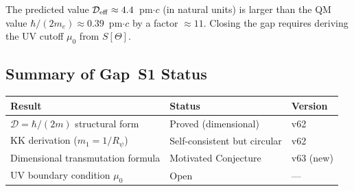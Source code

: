 \documentclass[12pt]{article}
\theoremstyle{definition}
\theoremstyle{remark}
\begin{document}
The predicted value $\mathcal{D}_{\rm eff} \approx 4.4$~pm$\cdot c$ (in natural
units) is larger than the QM value $\hbar/(2m_e) \approx 0.39$~pm$\cdot c$ by
a factor $\approx 11$.  Closing the gap requires deriving the UV cutoff
$\mu_0$ from $S[\Theta]$.

\subsection{Summary of Gap~S1 Status}

\begin{center}
\renewcommand{\arraystretch}{1.3}
\begin{tabular}{lll}
\hline
\textbf{Result} & \textbf{Status} & \textbf{Version} \\
\hline
$\mathcal{D} = \hbar/(2m)$ structural form & Proved (dimensional) & v62 \\
KK derivation ($m_1 = 1/R_\psi$) & Self-consistent but circular & v62 \\
Dimensional transmutation formula & Motivated Conjecture & v63 (new) \\
UV boundary condition $\mu_0$ & Open & — \\
\hline
\end{tabular}
\end{center}

\ifdefined\INCLUDEMODE
\else
\end{document}
